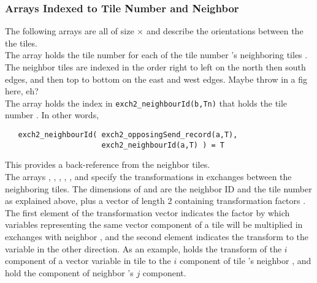 \subsubsection{Arrays Indexed to Tile Number and Neighbor}

The following arrays are all of size
$\times$ and describe the
orientations between the the tiles. \\

The array  holds the tile number
 for each of the tile number 's neighboring tiles
.  The neighbor tiles are indexed 
in the order right to left on the north then south edges, and then top
to bottom on the east and west edges.  Maybe throw in a fig here, eh?
\\

The  array holds the index
 in \texttt{exch2\_neighbourId(b,Tn)} that holds the tile
number .  In other words,
\begin{verbatim}
   exch2_neighbourId( exch2_opposingSend_record(a,T),
                      exch2_neighbourId(a,T) ) = T
\end{verbatim}
This provides a back-reference from the neighbor tiles. \\

The arrays ,
, ,
, , and
 specify the transformations in
exchanges between the neighboring tiles.  The dimensions of
 and  are the neighbor
ID  and the tile number  as explained above, plus a
vector of length 2 containing transformation factors .  The
first element of the transformation vector indicates the factor
 by which variables representing the same vector component of
a tile  will be multiplied in exchanges with neighbor
, and the second element indicates the transform to the
variable in the other direction.  As an example,
 holds the transform of the $i$ component of a
vector variable in tile  to the $i$ component of tile
's neighbor , and  hold the
component of neighbor 's $j$ component. \\
 
